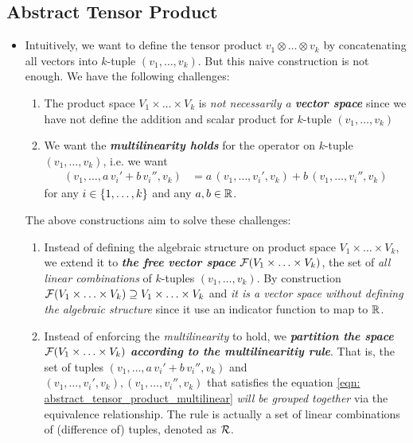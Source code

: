 \documentclass[11pt]{article}
\begin{document}
\subsection{Abstract Tensor Product}
\begin{itemize}
\item \begin{remark}
Intuitively, we want to define the tensor product $v_{1} \otimes \ldots \otimes v_{k}$ by concatenating all vectors into $k$-tuple $(v_{1}, \ldots, v_{k})$. But this naive construction is not enough. We have the following challenges:
\begin{enumerate}
\item The product space $V_1\times \ldots \times V_k$ is \emph{not necessarily a \textbf{vector space}} since we have not define the addition and scalar product for $k$-tuple $(v_{1}, \ldots, v_{k})$ 
\item We want the \emph{\textbf{multilinearity holds}} for the operator on $k$-tuple $(v_{1}, \ldots, v_{k})$, i.e. we want 
\begin{align}
(v_{1}, \ldots, a\,v_i' + b\,v_{i}'',  v_{k}) &= a\,(v_{1}, \ldots, v_i',  v_{k}) + b\,(v_{1}, \ldots, v_{i}'',  v_{k}) \label{eqn: abstract_tensor_product_multilinear}
\end{align} for any $i\in\left\{1,\ldots,k\right\}$ and any $a, b\in {\mathbb R}$.
\end{enumerate}
The above constructions aim to solve these challenges:
\begin{enumerate}
\item Instead of defining the algebraic structure on product space $V_1\times \ldots \times V_k$, we extend it to \emph{\textbf{the free vector space}} ${\mathcal F}(V_1\times \ldots \times V_k)$, the set of \emph{all linear combinations} of $k$-tuples $(v_{1}, \ldots, v_{k})$. By construction ${\mathcal F}(V_1\times \ldots \times V_k) \supseteq V_1\times \ldots \times V_k$ and \emph{it is a vector space without defining the algebraic structure} since it use an indicator function to map to ${\mathbb R}$.

\item Instead of enforcing the \emph{multilinearity} to hold,  we \emph{\textbf{partition the space}} ${\mathcal F}(V_1\times \ldots \times V_k)$ \emph{\textbf{according to the multilinearitiy rule}}. That is, the set of tuples $(v_{1}, \ldots, a\,v_i' + b\,v_{i}'',  v_{k})$ and $(v_{1}, \ldots, v_i',  v_{k}), (v_{1}, \ldots, v_{i}'',  v_{k})$ that satisfies the equation \eqref{eqn: abstract_tensor_product_multilinear} \emph{will be grouped together} via the equivalence relationship.  The rule is actually a set of linear combinations of (difference of) tuples, denoted as ${\mathcal R}$.  


\end{enumerate}
\end{remark}
\end{itemize}
\end{document}
